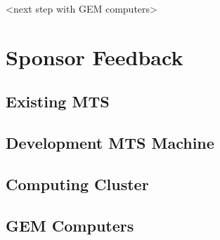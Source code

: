 \documentclass[12pt]{article}
\newcommand\tab[1][1cm]{\hspace*{#1}}
\begin{document}
\tab <next step with GEM computers>

\section{Sponsor Feedback}

\subsection{Existing MTS}

\vspace{1in}

\subsection{Development MTS Machine}

\vspace{1in}

\subsection{Computing Cluster}

\vspace{1in}

\subsection{GEM Computers}

\vspace{1in}
\end{document}
